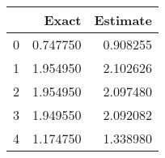 \begin{tabular}{lrr}
\toprule
 & Exact & Estimate \\
\midrule
0 & 0.747750 & 0.908255 \\
1 & 1.954950 & 2.102626 \\
2 & 1.954950 & 2.097480 \\
3 & 1.949550 & 2.092082 \\
4 & 1.174750 & 1.338980 \\
\bottomrule
\end{tabular}

